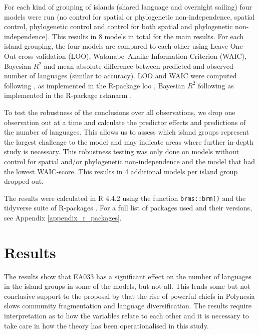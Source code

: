 \documentclass[unnumsec,webpdf,modern,medium]{oup-authoring-template}
\begin{document}
For each kind of grouping of islands (shared language and overnight sailing) four models were run (no control for spatial or phylogenetic non-independence, spatial control, phylogenetic control and control for both spatial and phylogenetic non-independence). This results in 8 models in total for the main results. For each island grouping, the four models are compared to each other using Leave-One-Out cross-validation (LOO), Watanabe–Akaike Information Criterion (WAIC), Bayesian $R^2$ and mean absolute difference between predicted and observed number of languages (similar to accuracy). LOO and WAIC were computed following  \citet{vehtari2017practical}, as implemented in the R-package loo \citep{R-loo}, Bayesian $R^2$ following \citet{gelman2019r} as implemented in the R-package rstanarm \citep{R-rstanarm},

To test the robustness of the conclusions over all observations, we drop one observation out at a time and calculate the predictor effects and predictions of the number of languages. This allows us to assess which island groups represent the largest challenge to the model and may indicate areas where further in-depth study is necessary. This robustness testing was only done on models without control for spatial and/or phylogenetic non-independence and the model that had the lowest WAIC-score. This results in 4 additional models per island group dropped out.

The results were calculated in R 4.4.2 \citep{R} using the function \texttt{brms::brm()} \citep{burkner2017brms} and the tidyverse suite of R-packages \citep{tidyverse13}. For a full list of packages used and their versions, see Appendix \ref{appendix_r_packages}.

\FloatBarrier
\section{Results}
The results show that EA033 has a significant effect on the number of languages in the island groups in some of the models, but not all. This lends some but not conclusive support to the proposal by \citet{pawley81, pawley2007} that the rise of powerful chiefs in Polynesia slows community fragmentation and language diversification. The results require interpretation as to how the variables relate to each other and it is necessary to take care in how the theory has been operationalised in this study. 

\end{document}
